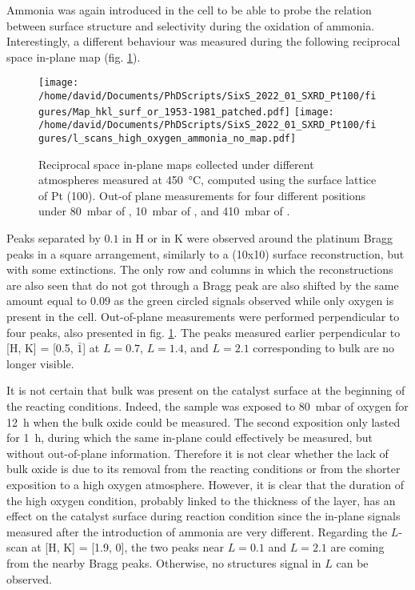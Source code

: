 Ammonia was again introduced in the cell to be able to probe the relation between surface structure and selectivity during the oxidation of ammonia.
Interestingly, a different behaviour was measured during the following reciprocal space in-plane map (fig. \ref{fig:MapsAndLScansPt100HighOxAmmonia}).

\begin{figure}[!htb]
    \centering
    \texttt{[image: /home/david/Documents/PhDScripts/SixS\_2022\_01\_SXRD\_Pt100/figures/Map\_hkl\_surf\_or\_1953-1981\_patched.pdf]}
    \texttt{[image: /home/david/Documents/PhDScripts/SixS\_2022\_01\_SXRD\_Pt100/figures/l\_scans\_high\_oxygen\_ammonia\_no\_map.pdf]}
    \caption{
        Reciprocal space in-plane maps collected under different atmospheres measured at \qty{450}{\degreeCelsius}, computed using the surface lattice of Pt (100).
        Out-of plane measurements for four different positions under \qty{80}{\milli\bar} of , \qty{10}{\milli\bar} of , and \qty{410}{\milli\bar} of .
    }
    \label{fig:MapsAndLScansPt100HighOxAmmonia}
\end{figure}

Peaks separated by $0.1$ in H or in K were observed around the platinum Bragg peaks in a square arrangement, similarly to a (10x10) surface reconstruction, but with some extinctions.
The only row and columns in which the reconstructions are also seen that do not got through a Bragg peak are also shifted by the same amount equal to $0.09$ as the green circled signals observed while only oxygen is present in the cell.
Out-of-plane measurements were performed perpendicular to four peaks, also presented in fig. \ref{fig:MapsAndLScansPt100HighOxAmmonia}.
The peaks measured earlier perpendicular to [H, K] = [0.5, $\bar{1}$] at $L=0.7$, $L=1.4$, and $L=2.1$ corresponding to bulk  are no longer visible.

It is not certain that bulk  was present on the catalyst surface at the beginning of the reacting conditions.
Indeed, the sample was exposed to \qty{80}{\milli\bar} of oxygen for \qty{12}{\hour} when the bulk oxide could be measured.
The second exposition only lasted for \qty{1}{\hour}, during which the same in-plane could effectively be measured, but without out-of-plane information.
Therefore it is not clear whether the lack of bulk oxide is due to its removal from the reacting conditions or from the shorter exposition to a high oxygen atmosphere.
However, it is clear that the duration of the high oxygen condition, probably linked to the thickness of the  layer, has an effect on the catalyst surface during reaction condition since the in-plane signals measured after the introduction of ammonia are very different.
Regarding the $L$-scan at [H, K] = [1.9, 0], the two peaks near $L=0.1$ and $L=2.1$ are coming from the nearby Bragg peaks.
Otherwise, no structures signal in $L$ can be observed.

